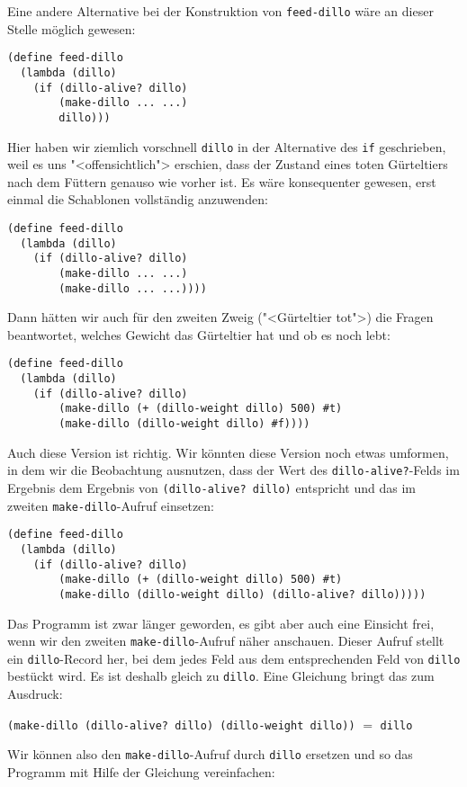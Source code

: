 Eine andere Alternative bei der Konstruktion von \lstinline{feed-dillo}
wäre an dieser Stelle möglich gewesen:
%
\begin{lstlisting}
(define feed-dillo
  (lambda (dillo)
    (if (dillo-alive? dillo)
        (make-dillo ... ...)
        dillo)))
\end{lstlisting}
%
Hier haben wir ziemlich vorschnell \lstinline{dillo} in der Alternative des
\lstinline{if} geschrieben, weil es uns "<offensichtlich"> erschien, dass
der Zustand eines toten Gürteltiers nach dem Füttern genauso wie
vorher ist.  Es wäre konsequenter gewesen, erst einmal die Schablonen
vollständig anzuwenden:
%
\begin{lstlisting}
(define feed-dillo
  (lambda (dillo)
    (if (dillo-alive? dillo)
        (make-dillo ... ...)
        (make-dillo ... ...))))
\end{lstlisting}
%
Dann hätten wir auch für den zweiten Zweig ("<Gürteltier tot">) die Fragen beantwortet,
welches Gewicht das Gürteltier hat und ob es noch lebt:
%
\begin{lstlisting}
(define feed-dillo
  (lambda (dillo)
    (if (dillo-alive? dillo)
        (make-dillo (+ (dillo-weight dillo) 500) #t)
        (make-dillo (dillo-weight dillo) #f))))
\end{lstlisting}
%
Auch diese Version ist richtig.  Wir könnten diese Version noch etwas
umformen, in dem wir die Beobachtung ausnutzen, dass der Wert des
\lstinline{dillo-alive?}-Felds im Ergebnis dem Ergebnis von
\lstinline{(dillo-alive? dillo)} entspricht und das im zweiten
\lstinline{make-dillo}-Aufruf einsetzen:
%
\begin{lstlisting}
(define feed-dillo
  (lambda (dillo)
    (if (dillo-alive? dillo)
        (make-dillo (+ (dillo-weight dillo) 500) #t)
        (make-dillo (dillo-weight dillo) (dillo-alive? dillo)))))
\end{lstlisting}
%
Das Programm ist zwar länger geworden, es gibt aber auch eine Einsicht
frei, wenn wir den zweiten \lstinline{make-dillo}-Aufruf näher anschauen.
Dieser Aufruf stellt ein \lstinline{dillo}-Record her, bei dem jedes Feld
aus dem entsprechenden Feld von \lstinline{dillo} bestückt wird.  Es ist
deshalb gleich zu \lstinline{dillo}.  Eine Gleichung bringt das zum Ausdruck:
%
\begin{center}
  \lstinline{(make-dillo (dillo-alive? dillo) (dillo-weight dillo))} $=$ \lstinline{dillo}
\end{center}
%
Wir können also den \lstinline{make-dillo}-Aufruf durch \lstinline{dillo}
ersetzen und so das Programm mit Hilfe der Gleichung vereinfachen:
